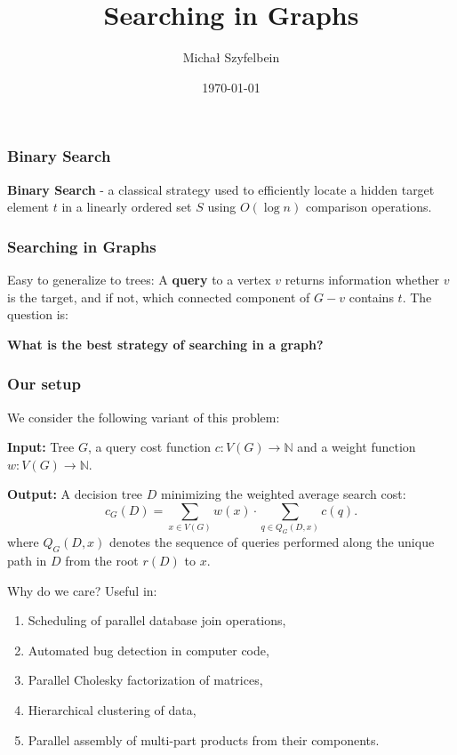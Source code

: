 \documentclass{beamer}
\title{Searching in Graphs
}
\author{Michał Szyfelbein}
\institute{Faculty of Electronics, Telecommunications and Informatics\\Gdańsk University of Technology, Poland}
\date{\today}
\newcommand{\br}[1]{\mathopen{}\left( #1 \right)}
\begin{document}

\usetikzlibrary {graphs,graphdrawing} 

\frame{\titlepage}

\begin{frame}
\frametitle{Binary Search}
\textbf{Binary Search} - a classical strategy used to efficiently locate a hidden target element $t$ in a linearly ordered set $S$ using $O\br{\log n}$ comparison operations.
\pause


\end{frame}

\begin{frame}
\frametitle{Searching in Graphs}
Easy to generalize to trees: A \textbf{query} to a vertex $v$ returns information whether $v$ is the target, and if not, which connected component of $G-v$ contains $t$. The question is: 

\textbf{What is the best strategy of searching in a graph?}
\pause


\end{frame}

\begin{frame}
\frametitle{Our setup}
We consider the following variant of this problem:
\begin{tcolorbox}[colback=white, title=Graph Search Problem (GSP), fonttitle=\bfseries, breakable]
\textbf{Input:} Tree $G$, a query cost function $c:V\br{G}\to \mathbb{N}$ and a weight function $w:V\br{G}\to \mathbb{N}$.

\pause
\textbf{Output:} A decision tree $D$ minimizing the weighted average search cost: 
$$c_G\br{D} = \sum_{x\in V\br{G}}w\br{x}\cdot \sum_{q\in Q_G\br{D, x}}c\br{q}.$$
where $Q_G\br{D,x}$ denotes the sequence of queries performed 
along the unique path in $D$ from the root $r\br{D}$ to $x$.
\end{tcolorbox}
\end{frame}

\begin{frame}{Why do we care?}
    Useful in:
    \begin{enumerate}
        \item Scheduling of parallel database join operations,
        \item Automated bug detection in computer code,
        \item Parallel Cholesky factorization of matrices,
        \item Hierarchical clustering of data,
        \item Parallel assembly of multi-part products from their components.
    \end{enumerate}
\end{frame}
\end{document}
